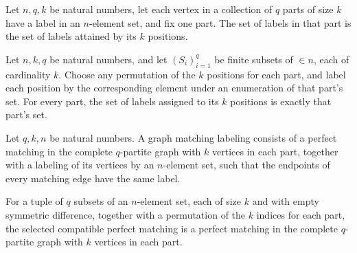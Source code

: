\begin{definition}
\label{FABL.matchingLabelSet}
\leanok
{}
Let $n,q,k$ be natural numbers, let each vertex in a collection of $q$ parts of size $k$
have a label in an $n$-element set, and fix one part. The set of labels in that part is
the set of labels attained by its $k$ positions.
\end{definition}

\begin{theorem}
\label{FABL.LevelKParityTuple.matchingLabelSet_assignedVertexLabel}
\leanok
{}
Let $n,k,q$ be natural numbers, and let $(S_i)_{i=1}^q$ be finite subsets of $\in n$,
each of cardinality $k$. Choose any permutation of the $k$ positions for each part, and
label each position by the corresponding element under an enumeration of that part’s
set. For every part, the set of labels assigned to its $k$ positions is exactly that
part’s set.
\end{theorem}

\begin{definition}
\label{FABL.GraphMatchingLabeling}
\leanok
{}
Let $q,k,n$ be natural numbers. A graph matching labeling consists of a perfect matching
in the complete $q$-partite graph with $k$ vertices in each part, together with a
labeling of its vertices by an $n$-element set, such that the endpoints of every
matching edge have the same label.
\end{definition}

\begin{definition}
\label{FABL.LevelKParityTuple.chosenCompatibleMatching}
\leanok
{}
For a tuple of $q$ subsets of an $n$-element set, each of size $k$ and with empty
symmetric difference, together with a permutation of the $k$ indices for each part, the
selected compatible perfect matching is a perfect matching in the complete $q$-partite
graph with $k$ vertices in each part.
\end{definition}

